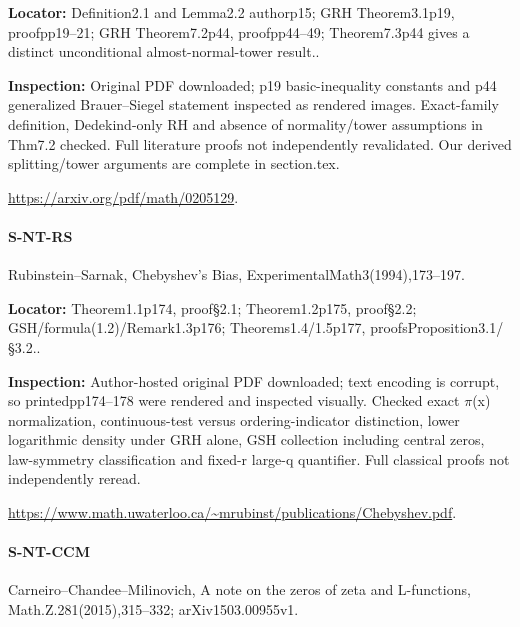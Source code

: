 \documentclass[11pt,a4paper]{article}
\begin{document}
\textbf{Locator:} Definition2.\allowbreak{}1 and Lemma2.\allowbreak{}2 authorp15; GRH Theorem3.\allowbreak{}1p19, proofpp19–\allowbreak{}21; GRH Theorem7.\allowbreak{}2p44, proofpp44–\allowbreak{}49; Theorem7.\allowbreak{}3p44 gives a distinct unconditional almost-normal-tower result.\allowbreak{}.

\textbf{Inspection:} Original PDF downloaded; p19 basic-inequality constants and p44 generalized Brauer–\allowbreak{}Siegel statement inspected as rendered images.\allowbreak{} Exact-family definition, Dedekind-only RH and absence of normality/\allowbreak{}tower assumptions in Thm7.\allowbreak{}2 checked.\allowbreak{} Full literature proofs not independently revalidated.\allowbreak{} Our derived splitting/\allowbreak{}tower arguments are complete in section.\allowbreak{}tex.\allowbreak{}

\url{https://arxiv.org/pdf/math/0205129}.

\paragraph{S-NT-RS} Rubinstein–\allowbreak{}Sarnak, Chebyshev’s Bias, ExperimentalMath3(1994),173–\allowbreak{}197.

\textbf{Locator:} Theorem1.\allowbreak{}1p174, proof§2.\allowbreak{}1; Theorem1.\allowbreak{}2p175, proof§2.\allowbreak{}2; GSH/\allowbreak{}formula(1.\allowbreak{}2)/\allowbreak{}Remark1.\allowbreak{}3p176; Theorems1.\allowbreak{}4/\allowbreak{}1.\allowbreak{}5p177, proofsProposition3.\allowbreak{}1/\allowbreak{}§3.\allowbreak{}2.\allowbreak{}.

\textbf{Inspection:} Author-hosted original PDF downloaded; text encoding is corrupt, so printedpp174–\allowbreak{}178 were rendered and inspected visually.\allowbreak{} Checked exact \ensuremath{\pi}(x) normalization, continuous-test versus ordering-indicator distinction, lower logarithmic density under GRH alone, GSH collection including central zeros, law-symmetry classification and fixed-r large-q quantifier.\allowbreak{} Full classical proofs not independently reread.\allowbreak{}

\url{https://www.math.uwaterloo.ca/~mrubinst/publications/Chebyshev.pdf}.

\paragraph{S-NT-CCM} Carneiro–\allowbreak{}Chandee–\allowbreak{}Milinovich, A note on the zeros of zeta and L-functions, Math.\allowbreak{}Z.\allowbreak{}281(2015),315–\allowbreak{}332; arXiv1503.\allowbreak{}00955v1.
\end{document}
